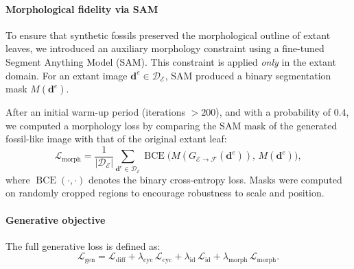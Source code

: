 \documentclass[pdflatex,lineno,sn-nature]{sn-jnl}%
\theoremstyle{plain}%
\theoremstyle{definition}%
\theoremstyle{remark}%
\begin{document}
\paragraph{Morphological fidelity via SAM}
To ensure that synthetic fossils preserved the morphological outline of extant leaves, we introduced an auxiliary morphology constraint using a fine-tuned Segment Anything Model (SAM). This constraint is applied \emph{only} in the extant domain. For an extant image $\mathbf{d}^e \in \mathcal{D}_{\mathcal{E}}$, SAM produced a binary segmentation mask $M(\mathbf{d}^e)$.

After an initial warm-up period (iterations $>200$), and with a probability of $0.4$, we computed a morphology loss by comparing the SAM mask of the generated fossil-like image with that of the original extant leaf:
\[
\mathcal{L}_{\text{morph}}
=
\frac{1}{|\mathcal{D}_{\mathcal{E}}|}
\sum_{\mathbf{d}^e \in \mathcal{D}_{\mathcal{E}}}
\operatorname{BCE}
\big(
M(G_{\mathcal{E}\rightarrow\mathcal{F}}(\mathbf{d}^e)),
\,
M(\mathbf{d}^e)
\big),
\]
where $\operatorname{BCE}(\cdot,\cdot)$ denotes the binary cross-entropy loss. Masks were computed on randomly cropped regions to encourage robustness to scale and position.


\paragraph{Generative objective}
The full generative loss is defined as:
\[
\mathcal{L}_{\text{gen}}
=
\mathcal{L}_{\text{diff}}
+
\lambda_{\text{cyc}}\,\mathcal{L}_{\text{cyc}}
+
\lambda_{\text{id}}\,\mathcal{L}_{\text{id}}
+
\lambda_{\text{morph}}\,\mathcal{L}_{\text{morph}}.
\]


\end{document}
